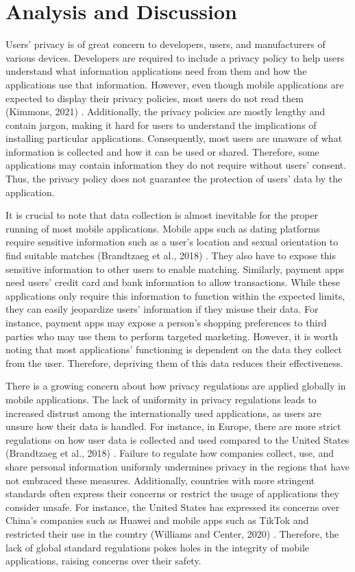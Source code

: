 \documentclass{article}
\begin{document}
\section*{Analysis and Discussion}
Users’ privacy is of great concern to developers, users, and manufacturers of various devices. Developers are required to include a privacy policy to help users understand what information applications need from them and how the applications use that information. However, even though mobile applications are expected to display their privacy policies, most users do not read them (Kimmons, 2021) \cite{Kimmons21}. Additionally, the privacy policies are mostly lengthy and contain jargon, making it hard for users to understand the implications of installing particular applications. Consequently, most users are unaware of what information is collected and how it can be used or shared. Therefore, some applications may contain information they do not require without users’ consent. Thus, the privacy policy does not guarantee the protection of users’ data by the application.


\medskip

It is crucial to note that data collection is almost inevitable for the proper running of most mobile applications. Mobile apps such as dating platforms require sensitive information such as a user’s location and sexual orientation to find suitable matches (Brandtzaeg et al., 2018) \cite{Petter18}. They also have to expose this sensitive information to other users to enable matching. Similarly, payment apps need users’ credit card and bank information to allow transactions. While these applications only require this information to function within the expected limits, they can easily jeopardize users’ information if they misuse their data. For instance, payment apps may expose a person’s shopping preferences to third parties who may use them to perform targeted marketing. However, it is worth noting that most applications’ functioning is dependent on the data they collect from the user. Therefore, depriving them of this data reduces their effectiveness.


\medskip

There is a growing concern about how privacy regulations are applied globally in mobile applications. The lack of uniformity in privacy regulations leads to increased distrust among the internationally used applications, as users are unsure how their data is handled. For instance, in Europe, there are more strict regulations on how user data is collected and used compared to the United States (Brandtzaeg et al., 2018) \cite{Petter18}. Failure to regulate how companies collect, use, and share personal information uniformly undermines privacy in the regions that have not embraced these measures. Additionally, countries with more stringent standards often express their concerns or restrict the usage of applications they consider unsafe. For instance, the United States has expressed its concerns over China’s companies such as Huawei and mobile apps such as TikTok and restricted their use in the country (Williams and Center, 2020) \cite{Williams20}. Therefore, the lack of global standard regulations pokes holes in the integrity of mobile applications, raising concerns over their safety.
\end{document}

